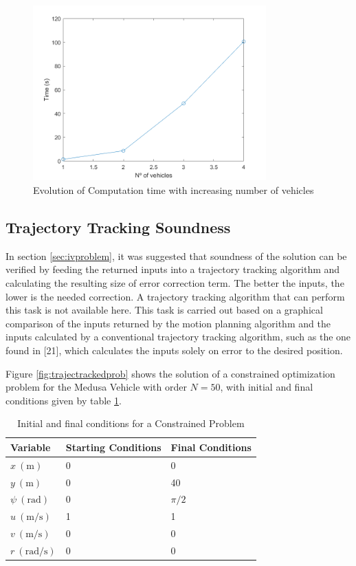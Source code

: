 \begin{figure}[h!]
\centering
\includegraphics[width=0.8\textwidth]{Images/results/timeevolutionmultiplevehicles.png}
\caption{Evolution of Computation time with increasing number of vehicles}
\label{fig:timeevolutionmultiplevehicles}
\end{figure}


\subsection{Trajectory Tracking Soundness}

\par In section \ref{sec:ivproblem}, it was suggested that soundness of the solution can be verified by feeding the returned inputs into a trajectory tracking algorithm and calculating the resulting size of error correction term. The better the inputs, the lower is the needed correction. A trajectory tracking algorithm that can perform this task is not available here. This task is carried out based on a graphical comparison of the inputs returned by the motion planning algorithm and the inputs calculated by a conventional trajectory tracking algorithm, such as the one found in [21], which calculates the inputs solely on error to the desired position.
\par Figure \ref{fig:trajectrackedprob} shows the solution of a constrained optimization problem for the Medusa Vehicle with order $N=50$, with initial and final conditions given by table \ref{tab:soundnessproblem}. 

\begin{table}[h!]
\centering
\begin{tabular}{|l|l|l|}
\hline
Variable & Starting Conditions & Final Conditions \\ \hline
$x\ (\si{\meter})$ & 0 & 0 \\
$y\ (\si{\meter})$ & 0 & 40 \\
$\psi\ (\si{\radian})$ & 0 & $\pi/2$ \\
$u\ (\si{\meter\per\second})$ & 1 & 1 \\
$v\ (\si{\meter\per\second})$ & 0 & 0 \\
$r\ (\si{\radian\per\second})$ & 0 & 0 \\
\hline
\end{tabular}
\caption{Initial and final conditions for a Constrained Problem}
\label{tab:soundnessproblem}
\end{table}

